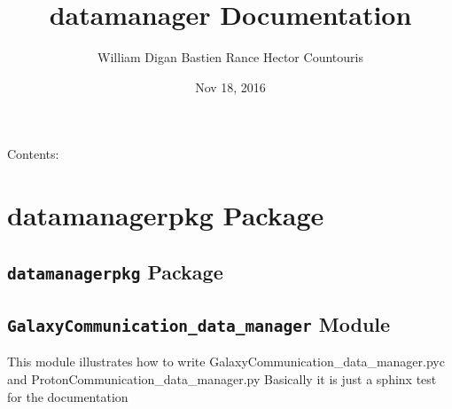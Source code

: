 \documentclass[letterpaper,10pt,english]{sphinxmanual}
\title{datamanager Documentation}
\date{Nov 18, 2016}
\author{William Digan Bastien Rance Hector Countouris}
\begin{document}
\maketitle
\tableofcontents
{}\label{index::doc}


Contents:


\chapter{datamanagerpkg Package}
\label{datamanagerpkg:datamanagerpkg-package}\label{datamanagerpkg:welcome-to-datamanager-s-documentation}\label{datamanagerpkg::doc}

\section{\texttt{datamanagerpkg} Package}
\label{datamanagerpkg:id1}\label{datamanagerpkg:module-datamanagerpkg.__init__}

\begin{fulllineitems}
\label{datamanagerpkg:datamanagerpkg.__init__.grou}
\end{fulllineitems}



\section{\texttt{GalaxyCommunication\_data\_manager} Module}
\label{datamanagerpkg:galaxycommunication-data-manager-module}\label{datamanagerpkg:module-datamanagerpkg.GalaxyCommunication_data_manager}
This module illustrates how to write 
GalaxyCommunication\_data\_manager.pyc
and ProtonCommunication\_data\_manager.py
Basically it is just a sphinx test for the documentation
\end{document}
